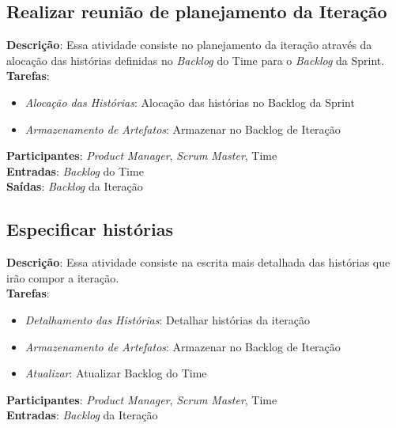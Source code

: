 \subsection{Realizar reunião de planejamento da Iteração}
  \textbf{Descrição}: Essa atividade consiste no planejamento da iteração através da alocação das histórias definidas no \textit{Backlog} do Time para o \textit{Backlog} da Sprint. \\

  \textbf{Tarefas}:
  \begin{itemize}
   \item \indent \textit{Alocação das Histórias}: Alocação das histórias no Backlog da Sprint

   \item \indent \textit{Armazenamento de Artefatos}: Armazenar no Backlog de Iteração
  \end{itemize}

  \textbf{Participantes}: \textit{Product Manager}, \textit{Scrum Master}, Time\\

  \textbf{Entradas}: \textit{Backlog} do Time \\

  \textbf{Saídas}:  \textit{Backlog} da Iteração\\

\subsection{Especificar histórias}
  \textbf{Descrição}: Essa atividade consiste na escrita mais detalhada das histórias que irão compor a
iteração. \\

  \textbf{Tarefas}:
  \begin{itemize}
   \item \indent \textit{Detalhamento das Histórias}: Detalhar histórias da iteração

   \item \indent \textit{Armazenamento de Artefatos}: Armazenar no Backlog de Iteração

   \item \indent \textit{Atualizar}: Atualizar Backlog do Time
  \end{itemize}

  \textbf{Participantes}: \textit{Product Manager}, \textit{Scrum Master}, Time\\

  \textbf{Entradas}: \textit{Backlog} da Iteração \\

